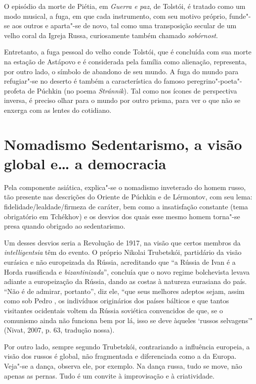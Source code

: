 O episódio da morte de Piétia, em \emph{Guerra e paz}, de Tolstói, é tratado como um modo musical, a fuga, em que cada instrumento, com seu motivo próprio, funde"-se aos outros e aparta"-se de novo, tal como uma transposição secular de um velho coral da Igreja Russa, curiosamente também chamado \emph{sobórnost}.

Entretanto, a fuga pessoal do velho conde Tolstói, que é concluída com sua morte na estação de Astápovo e é considerada pela família como alienação, representa, por outro lado, o símbolo de abandono de seu mundo. A fuga do mundo para refugiar"-se no deserto é também a característica do famoso peregrino"-poeta"-profeta de Púchkin (no poema \emph{Stránnik}). Tal como nos ícones de perspectiva inversa, é preciso olhar para o mundo por outro prisma, para ver o que não se enxerga com as lentes do cotidiano.

\section{Nomadismo  Sedentarismo, a visão global e\ldots{} a democracia}

Pela componente asiática, explica"-se o nomadismo inveterado do homem russo, tão presente nas descrições do Oriente de Púchkin e de Lérmontov, com seu lema: fidelidade/lealdade/firmeza de caráter, bem como a insatisfação constante (tema obrigatório em Tchékhov) e os desvios dos quais esse mesmo homem torna"-se presa quando obrigado ao sedentarismo.

Um desses desvios seria a Revolução de 1917, na visão que certos membros da \emph{intelligentsia} têm do evento. O próprio Nikolai Trubetskói, partidário da visão eurásica e não europeizada da Rússia, acreditando que ``a Rússia de Ivan  é a Horda russificada e \emph{bizantinizada}'', concluía que o novo regime bolchevista levava adiante a europeização da Rússia, dando as costas à natureza eurasiana do país. ``Não é de admirar, portanto'', diz ele, ``que seus melhores adeptos sejam, assim como sob Pedro , os indivíduos originários dos países bálticos e que tantos visitantes ocidentais voltem da Rússia
soviética convencidos de que, se o comunismo ainda não funciona bem por lá, isso se deve àqueles `russos selvagens'" (Nivat, 2007, p. 63, tradução nossa).

Por outro lado, sempre segundo Trubetskói, contrariando a influência europeia, a visão dos russos é global, não fragmentada e diferenciada como a da Europa. Veja"-se a dança, observa ele, por exemplo. Na dança russa, tudo se move, não apenas as pernas. Tudo é um convite à improvisação e à criatividade.

